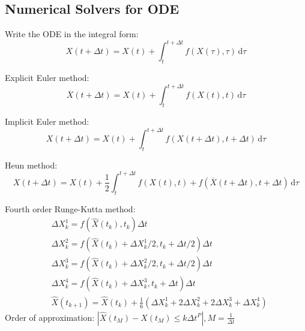 \subsection{Numerical Solvers for ODE}
Write the ODE in the integral form:
$$
X(t+\Delta  t) = X(t) + \int_{t}^{t+\Delta t} f(X(\tau  ),\tau  )  \,\mathrm{d}\tau  
$$

Explicit Euler method:
$$
\overline{X} (t+\Delta  t)= X(t) + \int_{t}^{t+\Delta t} f(X(t  ),t  )  \,\mathrm{d}\tau  
$$

Implicit Euler method:
$$
X(t+\Delta  t)= X(t) + \int_{t}^{t+\Delta t} f(X(t+\Delta t),t+\Delta t)  \,\mathrm{d}\tau  
$$

Heun method:
$$
X(t+\Delta  t)=  X(t) + \frac{1}{2}\int_{t}^{t+\Delta t} f(X(t),t) + f(\overline{X}(t+\Delta t),t+\Delta t) \,\mathrm{d}\tau  
$$

Fourth order Runge-Kutta method:
\begin{align*}
&\Delta X_k^1 = f(\widehat{X}(t_k),t_k )\Delta t\\
&\Delta X_k^2 = f(\widehat{X}(t_k)+\Delta X_k^1/2,t_k+\Delta t/2 )\Delta t\\
&\Delta X_k^3 = f(\widehat{X}(t_k)+\Delta X_k^2/2,t_k+\Delta t/2 )\Delta t\\
&\Delta X_k^4 = f(\widehat{X}(t_k)+\Delta X_k^3,t_k+\Delta t )\Delta t\\
&\widehat{X}(t_{k+1}) = \widehat{X}(t_{k})+\frac{1}{6}(\Delta X_k^1+2\Delta X_k^2+2\Delta X_k^3+\Delta X_k^4)
\end{align*}
Order of approximation: $\left\lvert \widehat{X}(t_M)-X(t_M)\leq k\Delta t^P\right\rvert ,M = \frac{1}{\Delta t}$